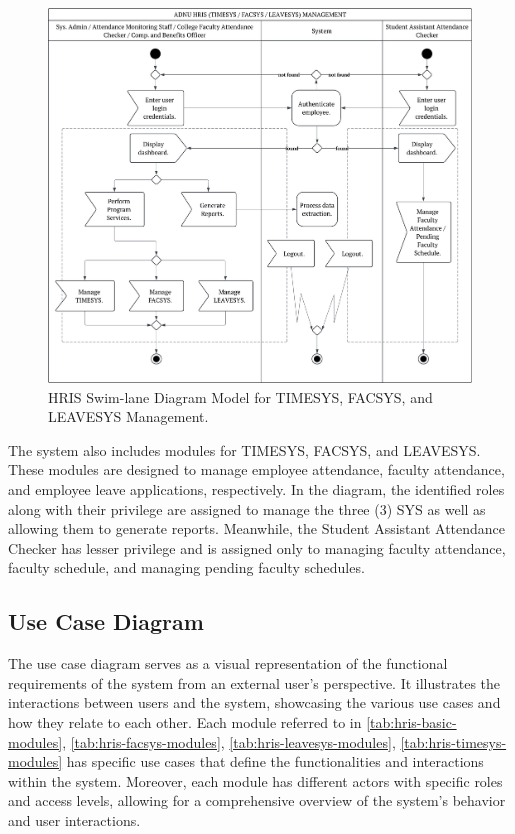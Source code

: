     \begin{figure}[H]
        \centering
        \includegraphics[width=1\linewidth]{figures/images/diagrams/swimlane/swimlane-sys-mgt.png}
        \caption{HRIS Swim-lane Diagram Model for TIMESYS, FACSYS, and LEAVESYS Management.}
        \label{fig:swimlane-sys-mgt}
    \end{figure}

    The system also includes modules for TIMESYS, FACSYS, and LEAVESYS. These modules are designed to manage employee attendance, faculty attendance, and employee leave applications, respectively. In the diagram, the identified roles along with their privilege are assigned to manage the three (3) SYS as well as allowing them to generate reports. Meanwhile, the Student Assistant Attendance Checker has lesser privilege and is assigned only to managing faculty attendance, faculty schedule, and managing pending faculty schedules.

    \subsection{Use Case Diagram}
    
    The use case diagram serves as a visual representation of the functional requirements of the system from an external user's perspective. It illustrates the interactions between users and the system, showcasing the various use cases and how they relate to each other. Each module referred to in \ref*{tab:hris-basic-modules}, \ref*{tab:hris-facsys-modules}, \ref*{tab:hris-leavesys-modules}, \ref*{tab:hris-timesys-modules} has specific use cases that define the functionalities and interactions within the system. Moreover, each module has different actors with specific roles and access levels, allowing for a comprehensive overview of the system's behavior and user interactions.
    
